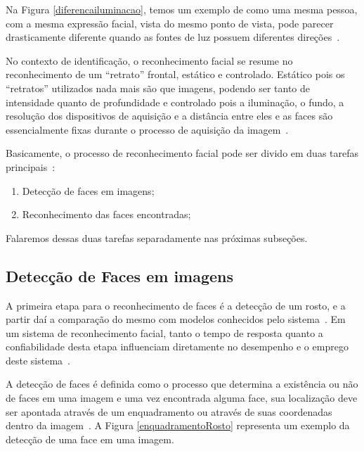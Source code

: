 Na Figura \ref{diferencailuminacao}, temos um exemplo de como uma mesma pessoa, com a mesma expressão facial, vista do mesmo ponto de vista, pode parecer drasticamente diferente quando as fontes de luz possuem diferentes direções~\cite{belhumeur}.

No contexto de identificação, o reconhecimento facial se resume no reconhecimento de um ``retrato'' frontal, estático e controlado. Estático pois os ``retratos'' utilizados nada mais são que imagens, podendo ser tanto de intensidade quanto de profundidade e controlado pois a iluminação, o fundo, a resolução dos dispositivos de aquisição e a distância entre eles e as faces são essencialmente fixas durante o processo de aquisição da imagem~\cite{hong}.

Basicamente, o processo de reconhecimento facial pode ser divido em duas tarefas principais~\cite{hong}:

	\begin{enumerate}
		\item Detecção de faces em imagens;
		\item Reconhecimento das faces encontradas;
	\end{enumerate}

Falaremos dessas duas tarefas separadamente nas próximas subseções.


\subsection{Detecção de Faces em imagens}
	
A primeira etapa para o reconhecimento de faces é a detecção de um rosto, e a partir daí a comparação do mesmo com modelos conhecidos pelo sistema~\cite{hong, oliveira}. Em um sistema de reconhecimento facial, tanto o tempo de resposta quanto a confiabilidade desta etapa influenciam diretamente no desempenho e o emprego deste sistema~\cite{oliveira}.

A detecção de faces é definida como o processo que determina a existência ou não de faces em uma imagem e uma vez encontrada alguma face, sua localização deve ser apontada através de um enquadramento ou através de suas coordenadas dentro da imagem~\cite{oliveira}. A Figura \ref{enquadramentoRosto} representa um exemplo da detecção de uma face em uma imagem.

